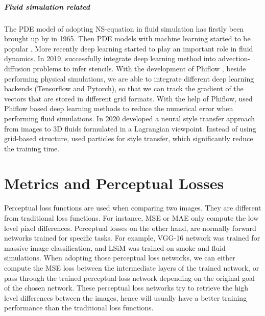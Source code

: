 \documentclass[a4paper,12pt,twoside]{report}
\begin{document}
\paragraph{Fluid simulation related}The PDE model of adopting NS-equation in fluid simulation has firstly been brought up by \cite{doi:10.1063/1.1761178} in 1965. Then PDE models with machine learning started to be popular \cite{crutchfield1987equations,kevrekidis2003equation,brunton2016discovering}. More recently deep learning started to play an important role in fluid dynamics\cite{kutz2017}. In 2019, \citeauthor{barsinai2019data} successfully integrate deep learning method into advection-diffusion problems to infer stencils. With the development of Phiflow \cite{holl2020learning}, beside performing physical simulations, we are able to integrate different deep learning backends (Tensorflow and Pytorch), so that we can track the gradient of the vectors that are stored in different grid formats. With the help of Phiflow, \cite{um2020sol} used Phiflow based deep learning methods to reduce the numerical error when performing fluid simulations. In 2020 \citeauthor{kim2020lagrangian} developed a neural style transfer approach from images to 3D fluids formulated in a Lagrangian viewpoint. Instead of using grid-based structure, \citeauthor{kim2020lagrangian} used particles for style transfer, which significantly reduce the training time.




\chapter{Metrics and Perceptual Losses}
Perceptual loss functions are used when comparing two images. They are different from traditional loss functions. For instance, MSE or MAE only compute the low level pixel differences. Perceptual losses on the other hand, are normally forward networks trained for specific tasks. For example, VGG-16 network was trained for massive image classification, and LSiM was trained on smoke and fluid simulations. When adopting those perceptual loss networks, we can either compute the MSE loss between the intermediate layers of the trained network, or pass through the trained perceptual loss network depending on the original goal of the chosen network. These perceptual loss networks try to retrieve the high level differences between the images, hence will usually have a better training performance than the traditional loss functions.
\end{document}
